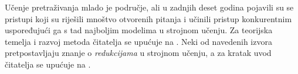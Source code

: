 Učenje pretraživanja mlado je područje, ali u zadnjih deset godina pojavili su
se pristupi koji su riješili mnoštvo otvorenih pitanja i učinili pristup
konkurentnim uspoređujući ga s tad najboljim modelima u strojnom učenju. Za
teorijska temelja i razvoj metoda \lts{} čitatelja se upućuje na
\citep{collins2004incremental, daume2005learning, daume09searn,
ross2011reduction, doppa2014hc, ross2014reinforcement, daume15lols,
andor2016globally}. Neki od navedenih izvora pretpostavljaju znanje o
\textit{redukcijama} u strojnom učenju, a za kratak uvod čitatelja se upućuje na
\citep{beygelzimer2005error, daume15reductions}.
